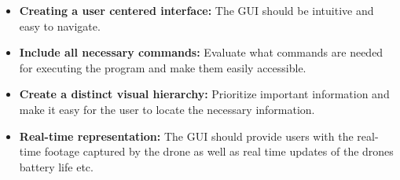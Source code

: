 \begin{itemize}
    \item \textbf{Creating a user centered interface:} The GUI should be intuitive and easy to navigate. 
    \item \textbf{Include all necessary commands:} Evaluate what commands are needed for executing the program and make them easily accessible. 
    \item \textbf{Create a distinct visual hierarchy:} Prioritize important information and make it easy for the user to locate the necessary information. 
    \item \textbf{Real-time representation:} The GUI should provide users with the real-time footage captured by the drone as well as real time updates of the drones battery life etc. 
    
\end{itemize}













